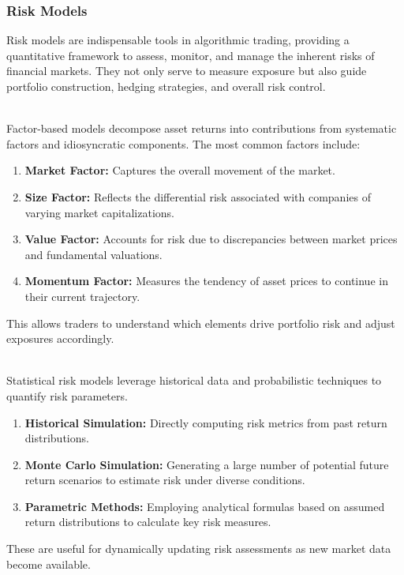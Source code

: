 \subsubsection{Risk Models}

Risk models are indispensable tools in algorithmic trading, providing a quantitative framework to assess, monitor, and manage the inherent risks of financial markets. They not only serve to measure exposure but also guide portfolio construction, hedging strategies, and overall risk control.

\begin{method} \\
Factor-based models decompose asset returns into contributions from systematic factors and idiosyncratic components. The most common factors include:
\begin{enumerate}[label=\roman*.]
	\setlength{\itemsep}{0pt}
    \item \textbf{Market Factor:} Captures the overall movement of the market.
    \item \textbf{Size Factor:} Reflects the differential risk associated with companies of varying market capitalizations.
    \item \textbf{Value Factor:} Accounts for risk due to discrepancies between market prices and fundamental valuations.
    \item \textbf{Momentum Factor:} Measures the tendency of asset prices to continue in their current trajectory.
\end{enumerate}
This allows traders to understand which elements drive portfolio risk and adjust exposures accordingly.
\end{method}

\begin{method} \\
Statistical risk models leverage historical data and probabilistic techniques to quantify risk parameters.
\begin{enumerate}[label=\roman*.]
	\setlength{\itemsep}{0pt}
    \item \textbf{Historical Simulation:} Directly computing risk metrics from past return distributions.
    \item \textbf{Monte Carlo Simulation:} Generating a large number of potential future return scenarios to estimate risk under diverse conditions.
    \item \textbf{Parametric Methods:} Employing analytical formulas based on assumed return distributions to calculate key risk measures.
\end{enumerate}
These are useful for dynamically updating risk assessments as new market data become available.
\end{method}

